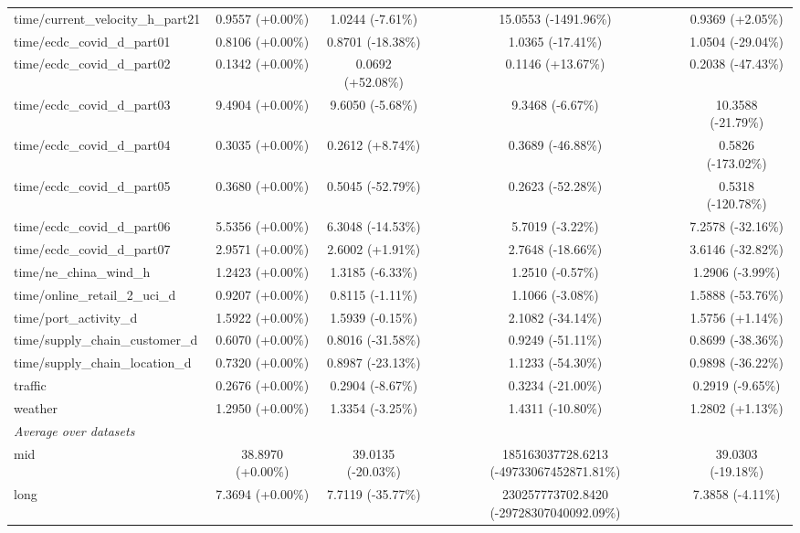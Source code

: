\begin{table}[htbp]
{\begin{tabular}{lcccc}
time/current\_velocity\_h\_part21 & 0.9557 (+0.00\%) & 1.0244 (-7.61\%) & 15.0553 (-1491.96\%) & 0.9369 (+2.05\%) \\
time/ecdc\_covid\_d\_part01 & 0.8106 (+0.00\%) & 0.8701 (-18.38\%) & 1.0365 (-17.41\%) & 1.0504 (-29.04\%) \\
time/ecdc\_covid\_d\_part02 & 0.1342 (+0.00\%) & 0.0692 (+52.08\%) & 0.1146 (+13.67\%) & 0.2038 (-47.43\%) \\
time/ecdc\_covid\_d\_part03 & 9.4904 (+0.00\%) & 9.6050 (-5.68\%) & 9.3468 (-6.67\%) & 10.3588 (-21.79\%) \\
time/ecdc\_covid\_d\_part04 & 0.3035 (+0.00\%) & 0.2612 (+8.74\%) & 0.3689 (-46.88\%) & 0.5826 (-173.02\%) \\
time/ecdc\_covid\_d\_part05 & 0.3680 (+0.00\%) & 0.5045 (-52.79\%) & 0.2623 (-52.28\%) & 0.5318 (-120.78\%) \\
time/ecdc\_covid\_d\_part06 & 5.5356 (+0.00\%) & 6.3048 (-14.53\%) & 5.7019 (-3.22\%) & 7.2578 (-32.16\%) \\
time/ecdc\_covid\_d\_part07 & 2.9571 (+0.00\%) & 2.6002 (+1.91\%) & 2.7648 (-18.66\%) & 3.6146 (-32.82\%) \\
time/ne\_china\_wind\_h & 1.2423 (+0.00\%) & 1.3185 (-6.33\%) & 1.2510 (-0.57\%) & 1.2906 (-3.99\%) \\
time/online\_retail\_2\_uci\_d & 0.9207 (+0.00\%) & 0.8115 (-1.11\%) & 1.1066 (-3.08\%) & 1.5888 (-53.76\%) \\
time/port\_activity\_d & 1.5922 (+0.00\%) & 1.5939 (-0.15\%) & 2.1082 (-34.14\%) & 1.5756 (+1.14\%) \\
time/supply\_chain\_customer\_d & 0.6070 (+0.00\%) & 0.8016 (-31.58\%) & 0.9249 (-51.11\%) & 0.8699 (-38.36\%) \\
time/supply\_chain\_location\_d & 0.7320 (+0.00\%) & 0.8987 (-23.13\%) & 1.1233 (-54.30\%) & 0.9898 (-36.22\%) \\
traffic & 0.2676 (+0.00\%) & 0.2904 (-8.67\%) & 0.3234 (-21.00\%) & 0.2919 (-9.65\%) \\
weather & 1.2950 (+0.00\%) & 1.3354 (-3.25\%) & 1.4311 (-10.80\%) & 1.2802 (+1.13\%) \\
\midrule
\multicolumn{5}{l}{\textit{Average over datasets}} \\
mid & 38.8970 (+0.00\%) & 39.0135 (-20.03\%) & 185163037728.6213 (-49733067452871.81\%) & 39.0303 (-19.18\%) \\
long & 7.3694 (+0.00\%) & 7.7119 (-35.77\%) & 230257773702.8420 (-29728307040092.09\%) & 7.3858 (-4.11\%) \\
\bottomrule
\end{tabular}%
}
\label{tab:tsfm-nmse-marginals}
\end{table}